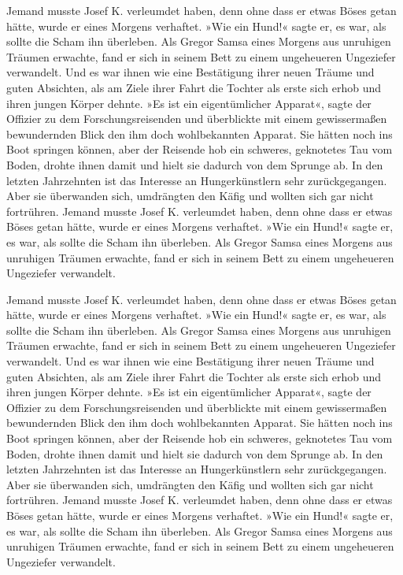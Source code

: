 Jemand musste Josef K. verleumdet haben, denn ohne dass er etwas Böses
getan hätte, wurde er eines Morgens verhaftet. »Wie ein Hund!« sagte er,
es war, als sollte die Scham ihn überleben. Als Gregor Samsa eines
Morgens aus unruhigen Träumen erwachte, fand er sich in seinem Bett zu
einem ungeheueren Ungeziefer verwandelt. Und es war ihnen wie eine
Bestätigung ihrer neuen Träume und guten Absichten, als am Ziele ihrer
Fahrt die Tochter als erste sich erhob und ihren jungen Körper dehnte.
»Es ist ein eigentümlicher Apparat«, sagte der Offizier zu dem
Forschungsreisenden und überblickte mit einem gewissermaßen bewundernden
Blick den ihm doch wohlbekannten Apparat. Sie hätten noch ins Boot
springen können, aber der Reisende hob ein schweres, geknotetes Tau vom
Boden, drohte ihnen damit und hielt sie dadurch von dem Sprunge ab. In
den letzten Jahrzehnten ist das Interesse an Hungerkünstlern sehr
zurückgegangen. Aber sie überwanden sich, umdrängten den Käfig und
wollten sich gar nicht fortrühren. Jemand musste Josef K. verleumdet
haben, denn ohne dass er etwas Böses getan hätte, wurde er eines Morgens
verhaftet. »Wie ein Hund!« sagte er, es war, als sollte die Scham ihn
überleben. Als Gregor Samsa eines Morgens aus unruhigen Träumen
erwachte, fand er sich in seinem Bett zu einem ungeheueren Ungeziefer
verwandelt.

Jemand musste Josef K. verleumdet haben, denn ohne dass er etwas Böses
getan hätte, wurde er eines Morgens verhaftet. »Wie ein Hund!« sagte er,
es war, als sollte die Scham ihn überleben. Als Gregor Samsa eines
Morgens aus unruhigen Träumen erwachte, fand er sich in seinem Bett zu
einem ungeheueren Ungeziefer verwandelt. Und es war ihnen wie eine
Bestätigung ihrer neuen Träume und guten Absichten, als am Ziele ihrer
Fahrt die Tochter als erste sich erhob und ihren jungen Körper dehnte.
»Es ist ein eigentümlicher Apparat«, sagte der Offizier zu dem
Forschungsreisenden und überblickte mit einem gewissermaßen bewundernden
Blick den ihm doch wohlbekannten Apparat. Sie hätten noch ins Boot
springen können, aber der Reisende hob ein schweres, geknotetes Tau vom
Boden, drohte ihnen damit und hielt sie dadurch von dem Sprunge ab. In
den letzten Jahrzehnten ist das Interesse an Hungerkünstlern sehr
zurückgegangen. Aber sie überwanden sich, umdrängten den Käfig und
wollten sich gar nicht fortrühren. Jemand musste Josef K. verleumdet
haben, denn ohne dass er etwas Böses getan hätte, wurde er eines Morgens
verhaftet. »Wie ein Hund!« sagte er, es war, als sollte die Scham ihn
überleben. Als Gregor Samsa eines Morgens aus unruhigen Träumen
erwachte, fand er sich in seinem Bett zu einem ungeheueren Ungeziefer
verwandelt.

